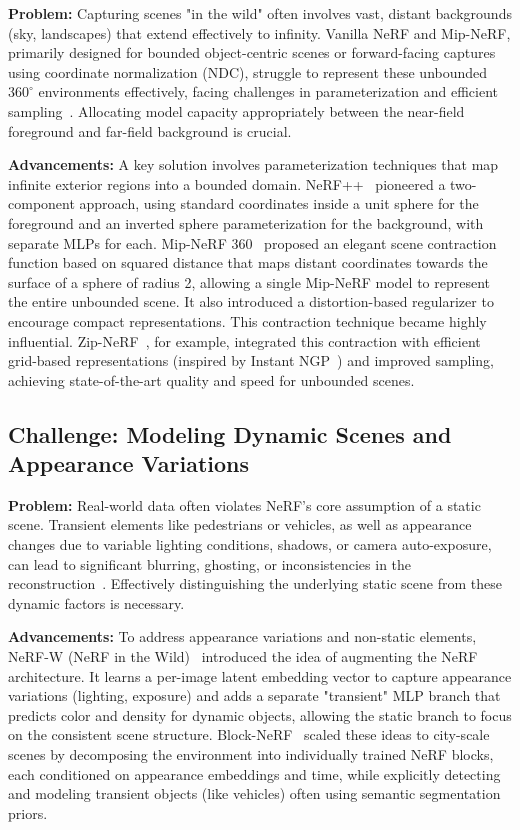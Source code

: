 \textbf{Problem:} Capturing scenes "in the wild" often involves vast, distant backgrounds (sky, landscapes) that extend effectively to infinity. Vanilla NeRF and Mip-NeRF, primarily designed for bounded object-centric scenes or forward-facing captures using coordinate normalization (NDC), struggle to represent these unbounded $360^\circ$ environments effectively, facing challenges in parameterization and efficient sampling~\cite{zhang2020nerfplusplus, barron2022mipnerf360}. Allocating model capacity appropriately between the near-field foreground and far-field background is crucial.

\textbf{Advancements:} A key solution involves parameterization techniques that map infinite exterior regions into a bounded domain. NeRF++~\cite{zhang2020nerfplusplus} pioneered a two-component approach, using standard coordinates inside a unit sphere for the foreground and an inverted sphere parameterization for the background, with separate MLPs for each. Mip-NeRF 360~\cite{barron2022mipnerf360} proposed an elegant scene contraction function based on squared distance that maps distant coordinates towards the surface of a sphere of radius 2, allowing a single Mip-NeRF model to represent the entire unbounded scene. It also introduced a distortion-based regularizer to encourage compact representations. This contraction technique became highly influential. Zip-NeRF~\cite{barron2023zipnerf}, for example, integrated this contraction with efficient grid-based representations (inspired by Instant NGP~\cite{mueller2022instant}) and improved sampling, achieving state-of-the-art quality and speed for unbounded scenes.

\subsection{Challenge: Modeling Dynamic Scenes and Appearance Variations}
\label{subsec:dynamic_challenge_revised}

\textbf{Problem:} Real-world data often violates NeRF's core assumption of a static scene. Transient elements like pedestrians or vehicles, as well as appearance changes due to variable lighting conditions, shadows, or camera auto-exposure, can lead to significant blurring, ghosting, or inconsistencies in the reconstruction~\cite{martinbrualla2021nerfw, tancik2022blocknerf}. Effectively distinguishing the underlying static scene from these dynamic factors is necessary.

\textbf{Advancements:} To address appearance variations and non-static elements, NeRF-W (NeRF in the Wild)~\cite{martinbrualla2021nerfw} introduced the idea of augmenting the NeRF architecture. It learns a per-image latent embedding vector to capture appearance variations (lighting, exposure) and adds a separate "transient" MLP branch that predicts color and density for dynamic objects, allowing the static branch to focus on the consistent scene structure. Block-NeRF~\cite{tancik2022blocknerf} scaled these ideas to city-scale scenes by decomposing the environment into individually trained NeRF blocks, each conditioned on appearance embeddings and time, while explicitly detecting and modeling transient objects (like vehicles) often using semantic segmentation priors.

